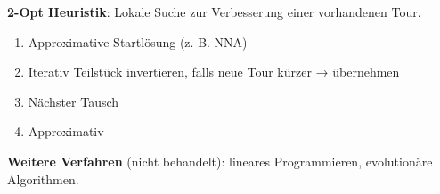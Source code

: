 \documentclass[11pt, a4paper]{article}
\begin{document}
\textbf{2-Opt Heuristik}: Lokale Suche zur Verbesserung einer vorhandenen Tour.

\begin{enumerate}
  \item Approximative Startlösung (z. B. NNA)
  \item Iterativ Teilstück invertieren, falls neue Tour kürzer → übernehmen
  \item Nächster Tausch
  \item Approximativ
\end{enumerate}

\textbf{Weitere Verfahren} (nicht behandelt): lineares Programmieren, evolutionäre Algorithmen.





\end{document}
